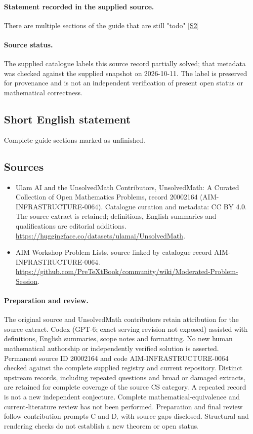 \documentclass[11pt]{article}
\begin{document}
\paragraph{Statement recorded in the supplied source.}
There are multiple sections of the guide that are still "todo" \href{https://github.com/PreTeXtBook/community/wiki/Moderated-Problem-Session}{[S2]}
\paragraph{Source status.}
The supplied catalogue labels this source record partially solved; that metadata was checked against the supplied snapshot on 2026-10-11. The label is preserved for provenance and is not an independent verification of present open status or mathematical correctness.
\subsection{Short English statement}
Complete guide sections marked as unfinished.
\subsection{Sources}
\begin{itemize}
\item[S1] Ulam AI and the UnsolvedMath Contributors, UnsolvedMath: A Curated Collection of Open Mathematics Problems, record 20002164 (AIM-INFRASTRUCTURE-0064). Catalogue curation and metadata: CC BY 4.0. The source extract is retained; definitions, English summaries and qualifications are editorial additions.
\url{https://huggingface.co/datasets/ulamai/UnsolvedMath}.
\item[S2] AIM Workshop Problem Lists, source linked by catalogue record AIM-INFRASTRUCTURE-0064.
\url{https://github.com/PreTeXtBook/community/wiki/Moderated-Problem-Session}.
\end{itemize}
\paragraph{Preparation and review.}
The original source and UnsolvedMath contributors retain attribution for the source extract. Codex (GPT-6; exact serving revision not exposed) assisted with definitions, English summaries, scope notes and formatting. No new human mathematical authorship or independently verified solution is asserted. Permanent source ID 20002164 and code AIM-INFRASTRUCTURE-0064 checked against the complete supplied registry and current repository. Distinct upstream records, including repeated questions and broad or damaged extracts, are retained for complete coverage of the source CS category. A repeated record is not a new independent conjecture. Complete mathematical-equivalence and current-literature review has not been performed. Preparation and final review follow contribution prompts C and D, with source gaps disclosed. Structural and rendering checks do not establish a new theorem or open status.
\label{end:20002164}
\end{document}
